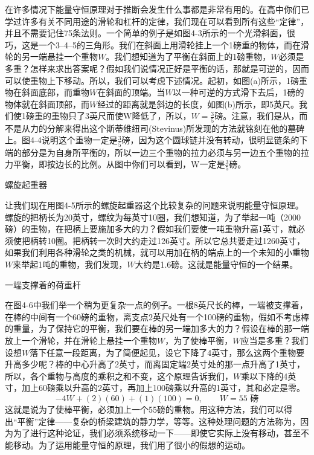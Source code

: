 \documentclass[12pt,oneside]{book}
\begin{document}
\begin{common-format}
在许多情况下能量守恒原理对于推断会发生什么事都是非常有用的。在高中你们已学过许多有关不同用途的滑轮和杠杆的定律，我们现在可以看到所有这些“定律”，并且不需要记住75条法则。一个简单的例子是如图4-3所示的一个光滑斜面，很巧，这是一个3--4--5的三角形。我们在斜面上用滑轮挂上一个1磅重的物体，而在滑轮的另一端悬挂一个重物$ W $。我们想知道为了平衡在斜面上的1磅重物，$ W $必须是多重？怎样来求出答案呢？假如我们说情况正好是平衡的话，那就是可逆的，因而可以使重物上下移动。所以，我们可以考虑下述情况。起初，如图(a)所示，1磅重物在斜面底部，而重物$ W $在斜面的顶端。当$ W $以一种可逆的方式滑下去后，1磅的物体就在斜面顶部，而$ W $经过的距离就是斜边的长度，如图(b)所示，即5英尺。我们使1磅重的重物只了3英尺而使W降低了，所以，$ W=\frac{3}{5} $磅。注意，我们是从，而不是从力的分解来得出这个斯蒂维纽司(Stevinus)所发现的方法就铭刻在他的墓碑上。图4-4说明这个重物一定是$ \frac{3}{5} $磅，因为这个圆球链并没有转动，很明显链条的下端的部分是为自身所平衡的，所以一边三个重物的拉力必须与另一边五个重物的拉力平衡，即按边长的比例。从图中你们可以看到，W一定是$ \frac{3}{5} $磅。
\begin{fig}{螺旋起重器}
\caption{螺旋起重器}
\label{fig:螺旋起重器}
\end{fig}
让我们现在用图4-5所示的螺旋起重器这个比较复杂的问题来说明能量守恒原理。螺旋的把柄长为20英寸，螺纹为每英寸10圈，我们想知道，为了举起一吨（2000磅）的重物，在把柄上要施加多大的力？假如我们要使一吨重物升高1英寸，就必须使把柄转10圈。把柄转一次时大约走过126英寸。所以它总共要走过1260英寸，如果我们利用各种滑轮之类的机械，就可以用加在柄的端点上的一个未知的小重物$ W $来举起1吨的重物，我们发现，$ W $大约是1.6磅。这就是能量守恒的一个结果。
\begin{fig}{一端支撑着的荷重杆}
\caption{一端支撑着的荷重杆}
\label{fig:一端支撑着的荷重杆}
\end{fig}
在图4-6中我们举一个稍为更复杂一点的例子。一根8英尺长的棒，一端被支撑着，在棒的中间有一个60磅的重物，离支点2英尺处有一个100磅的重物，假如不考虑棒的重量，为了保持它的平衡，我们要在棒的另一端加多大的力？假设在棒的那一端放上一个滑轮，并在滑轮上悬挂一个重物$ W $，为了使棒平衡，$ W $应当是多重？我们设想$ W $落下任意一段距离，为了简便起见，设它下降了4英寸，那么这两个重物要升高多少呢？棒的中心升高了2英寸，而离固定端2英寸处的那一点升高了1英寸，所以，各个重物与高度的乘积之和不变，这个原理告诉我们，$ W $乘以下降的4英寸，加上60磅乘以升高的2英寸，再加上100磅乘以升高的1英寸，其和必定是零。
\begin{equation}
\label{Eq:I:4:5}
-4W+(2)(60)+(1)(100)=0,\qquad
W=\text{$55$ 磅}
\end{equation}
这就是说为了使棒平衡，必须加上一个55磅的重物。用这种方法，我们可以得出“平衡”定律——复杂的桥梁建筑的静力学，等等。这种处理问题的方法称为，因为为了进行这种论证，我们必须系统移动一下——即使它实际上没有移动，甚至不能移动。为了运用能量守恒的原理，我们用了很小的假想的运动。




\end{common-format}
\end{document}

